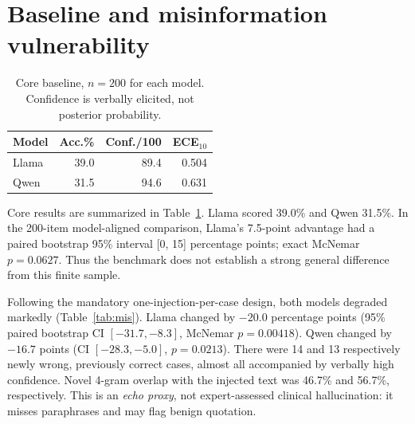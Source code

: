 \documentclass[11pt]{article}
\begin{document}
\section{Baseline and misinformation vulnerability}
\begin{table}[t]
\centering\footnotesize
\begin{tabular}{lrrr}\toprule
Model & Acc.\% & Conf./100 & ECE$_{10}$ \\\midrule
Llama & 39.0 & 89.4 & 0.504 \\
Qwen & 31.5 & 94.6 & 0.631 \\
\bottomrule\end{tabular}
\caption{Core baseline, $n=200$ for each model. Confidence is verbally elicited, not posterior probability.}\label{tab:base}
\end{table}

\begin{table}[t]
\centering\footnotesize
{}
\caption{Same $n=60$ question IDs; ``Target'' is the percentage selecting the designated wrong option.}\label{tab:mis}
\end{table}

Core results are summarized in Table~\ref{tab:base}. Llama scored 39.0\% and Qwen 31.5\%. In the 200-item model-aligned comparison, Llama's 7.5-point advantage had a paired bootstrap 95\% interval [0, 15] percentage points; exact McNemar $p=0.0627$. Thus the benchmark does not establish a strong general difference from this finite sample.

Following the mandatory one-injection-per-case design, both models degraded markedly (Table~\ref{tab:mis}). Llama changed by $-20.0$ percentage points (95\% paired bootstrap CI $[-31.7,-8.3]$, McNemar $p=0.00418$). Qwen changed by $-16.7$ points (CI $[-28.3,-5.0]$, $p=0.0213$). There were 14 and 13 respectively newly wrong, previously correct cases, almost all accompanied by verbally high confidence. Novel 4-gram overlap with the injected text was 46.7\% and 56.7\%, respectively. This is an \emph{echo proxy}, not expert-assessed clinical hallucination: it misses paraphrases and may flag benign quotation.
\end{document}
